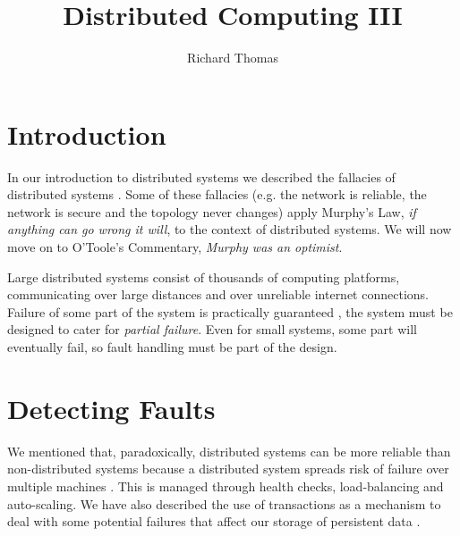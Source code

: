 \title{Distributed Computing III}
\author{Richard Thomas}
\date{}

\maketitle

\section{Introduction}

In our introduction to distributed systems we described the fallacies of distributed systems \cite{distributed1-notes}.
Some of these fallacies (e.g. the network is reliable, the network is secure and the topology never changes)
apply Murphy's Law, \textit{if anything can go wrong it will}, to the context of distributed systems.
We will now move on to O'Toole's Commentary, \textit{Murphy was an optimist}.

Large distributed systems consist of thousands of computing platforms,
communicating over large distances and over unreliable internet connections.
Failure of some part of the system is practically guaranteed \cite{datacenter-computer},
the system must be designed to cater for \emph{partial failure}.
Even for small systems, some part will eventually fail,
so fault handling must be part of the design.


\section{Detecting Faults}

We mentioned that, paradoxically, distributed systems can be more reliable than non-distributed systems
because a distributed system spreads risk of failure over multiple machines \cite{distributed1-notes}.
This is managed through health checks, load-balancing and auto-scaling.
We have also described the use of transactions as a mechanism to deal with some potential failures
that affect our storage of persistent data \cite{distributed2-notes}.


